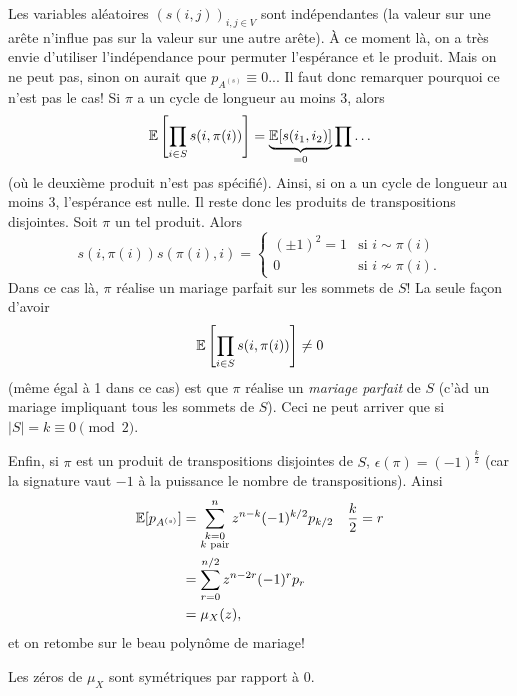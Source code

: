 \begin{preuve}[de la Proposition]
\begin{enumerate}
    Les variables aléatoires $(s(i,j))_{i,j \in V}$ sont indépendantes (la valeur sur une arête n'influe pas
    sur la valeur sur une autre arête). À ce moment là, on a très envie d'utiliser l'indépendance pour
    permuter l'espérance et le produit. Mais on ne peut pas, sinon on aurait que $p_{A^{(s)}} \equiv 0$... Il
    faut donc remarquer pourquoi ce n'est pas le cas! Si $\pi$ a un cycle de longueur au moins 3, alors 
    \[ \mathbb{E}\left[\prod_{i \in S} s(i, \pi(i))\right] = \underbrace{\mathbb{E}[s(i_1, i_2)]}_{=0} \prod \ldots  \]
    (où le deuxième produit n'est pas spécifié). Ainsi, si on a un cycle de longueur au moins $3$, l'espérance
    est nulle. Il reste donc les produits de transpositions disjointes. Soit $\pi$ un tel produit. Alors 
    \[ s(i, \pi(i))s(\pi(i), i) =
      \begin{cases}
        (\pm 1)^2 = 1 & \text{si } i \sim \pi(i)\\
        0 & \text{si } i \not \sim \pi(i).
      \end{cases}
    \]
    Dans ce cas là, $\pi$ réalise un mariage parfait sur les sommets de $S$! La seule façon d'avoir 
    \[ \mathbb{E}\left[\prod_{i \in S} s(i, \pi(i))\right] \neq 0 \]
    (même égal à 1 dans ce cas) est que $\pi$ réalise un \emph{mariage parfait} de $S$
    (c'àd un mariage impliquant tous les sommets de $S$). Ceci ne peut arriver que si $|S| = k \equiv 0 \pmod
    2$.

    Enfin, si $\pi$ est un produit de transpositions disjointes de $S$, $\epsilon(\pi) = (-1)^{\frac{k}{2}}$
    (car la signature vaut $-1$ à la puissance le nombre de transpositions). Ainsi 
    \begin{align*}
      \mathbb{E}[p_{A^{(s)}}] &= \sum_{\substack{k = 0\\k \text{ pair}}}^{n} z^{n-k}(-1)^{k/2} p_{k/2} & \frac{k}{2} = r\\
                      &= \sum_{r = 0}^{n/2}z^{n-2r}(-1)^r p_r\\
      &= \mu_X(z),
    \end{align*}
    et on retombe sur le beau polynôme de mariage!
    \begin{exercice}
      Les zéros de $\mu_X$ sont symétriques par rapport à $0$.
    \end{exercice}


\end{enumerate}
\end{preuve}
